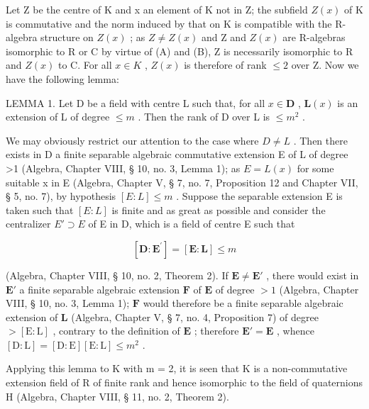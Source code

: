 Let Z be the centre of K and x an element of K not in Z; the subfield \(Z(x)\) of K is commutative and the norm induced by that on K is compatible with the R-algebra structure on \(Z(x)\) ; as \(Z \neq Z(x)\) and Z and \(Z(x)\) are R-algebras isomorphic to R or C by virtue of (A) and (B), Z is necessarily isomorphic to R and \(Z(x)\) to C. For all \(x \in K\) , \(Z(x)\) is therefore of rank \(\leqslant 2\) over Z. Now we have the following lemma:

LEMMA 1. Let D be a field with centre L such that, for all \(x \in \mathbf{D}\) , \(\mathbf{L}(x)\) is an extension of L of degree \(\leqslant m\) . Then the rank of D over L is \(\leqslant m^2\) .

We may obviously restrict our attention to the case where \(D \neq L\) . Then there exists in D a finite separable algebraic commutative extension E of L of degree >1 (Algebra, Chapter VIII, § 10, no. 3, Lemma 1); as \(E = L(x)\) for some suitable x in E (Algebra, Chapter V, § 7, no. 7, Proposition 12 and Chapter VII, § 5, no. 7), by hypothesis \([E: L] \leqslant m\) . Suppose the separable extension E is taken such that \([E: L]\) is finite and as great as possible and consider the centralizer \(E' \supset E\) of E in D, which is a field of centre E such that

\[
[ \mathbf {D} \colon \mathbf {E} ^ {\prime} ] = [ \mathbf {E} \colon \mathbf {L} ] \leqslant m
\]

(Algebra, Chapter VIII, § 10, no. 2, Theorem 2). If \(\mathbf{E} \neq \mathbf{E}'\) , there would exist in \(\mathbf{E}'\) a finite separable algebraic extension \(\mathbf{F}\) of \(\mathbf{E}\) of degree \(>1\) (Algebra, Chapter VIII, § 10, no. 3, Lemma 1); \(\mathbf{F}\) would therefore be a finite separable algebraic extension of \(\mathbf{L}\) (Algebra, Chapter V, § 7, no. 4, Proposition 7) of degree \(>[\mathrm{E:L}]\) , contrary to the definition of \(\mathbf{E}\) ; therefore \(\mathbf{E}' = \mathbf{E}\) , whence \([\mathrm{D:L}] = [\mathrm{D:E}][\mathrm{E:L}] \leqslant m^2\) .

Applying this lemma to K with m = 2, it is seen that K is a non-commutative extension field of R of finite rank and hence isomorphic to the field of quaternions H (Algebra, Chapter VIII, § 11, no. 2, Theorem 2).

